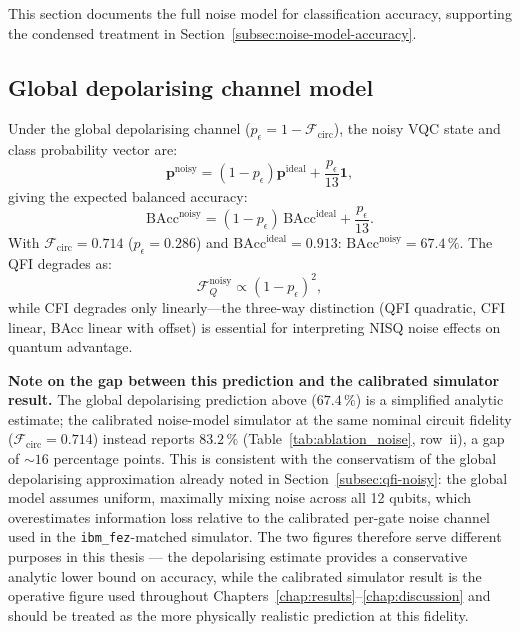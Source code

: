 \documentclass[11pt,a4paper, english]{book}
\theoremstyle{plain}
\theoremstyle{definition}
\numberwithin{equation}{chapter}
\numberwithin{figure}{chapter}
\numberwithin{table}{chapter}
\begin{document}
This section documents the full noise model for classification accuracy, supporting
the condensed treatment in Section~\ref{subsec:noise-model-accuracy}.

\subsection{Global depolarising channel model}

Under the global depolarising channel ($p_\epsilon = 1 - \mathcal{F}_\text{circ}$),
the noisy VQC state and class probability vector are:
\begin{equation}
  \label{eq:noisy_probs}
  \mathbf{p}^\text{noisy} = (1-p_\epsilon)\mathbf{p}^\text{ideal}
    + \frac{p_\epsilon}{13}\mathbf{1},
\end{equation}
giving the expected balanced accuracy:
\begin{equation}
  \label{eq:bacc_noisy}
  \text{BAcc}^\text{noisy}
    = (1-p_\epsilon)\,\text{BAcc}^\text{ideal} + \frac{p_\epsilon}{13}.
\end{equation}
With $\mathcal{F}_\text{circ} = 0.714$ ($p_\epsilon = 0.286$) and
$\text{BAcc}^\text{ideal} = 0.913$: $\text{BAcc}^\text{noisy} = 67.4\,\%$.
The QFI degrades as:
\begin{equation}
  \label{eq:qfi_scaling_noisy}
  \mathcal{F}_Q^\text{noisy} \propto (1-p_\epsilon)^2,
\end{equation}
while CFI degrades only linearly---the three-way distinction (QFI quadratic,
CFI linear, BAcc linear with offset) is essential for interpreting NISQ noise
effects on quantum advantage.

\noindent\textbf{Note on the gap between this prediction and the
calibrated simulator result.} The global depolarising prediction above
($67.4\,\%$) is a simplified analytic estimate; the calibrated
noise-model simulator at the same nominal circuit fidelity
($\mathcal{F}_\mathrm{circ}=0.714$) instead reports $83.2\,\%$
(Table~\ref{tab:ablation_noise}, row~ii), a gap of ${\sim}16$
percentage points. This is consistent with the conservatism of the
global depolarising approximation already noted in
Section~\ref{subsec:qfi-noisy}: the global model assumes uniform,
maximally mixing noise across all 12 qubits, which overestimates
information loss relative to the calibrated per-gate noise channel
used in the \texttt{ibm\_fez}-matched simulator. The two figures
therefore serve different purposes in this thesis --- the depolarising
estimate provides a conservative analytic lower bound on accuracy,
while the calibrated simulator result is the operative figure used
throughout Chapters~\ref{chap:results}--\ref{chap:discussion} and
should be treated as the more physically realistic prediction at this
fidelity.
\end{document}
